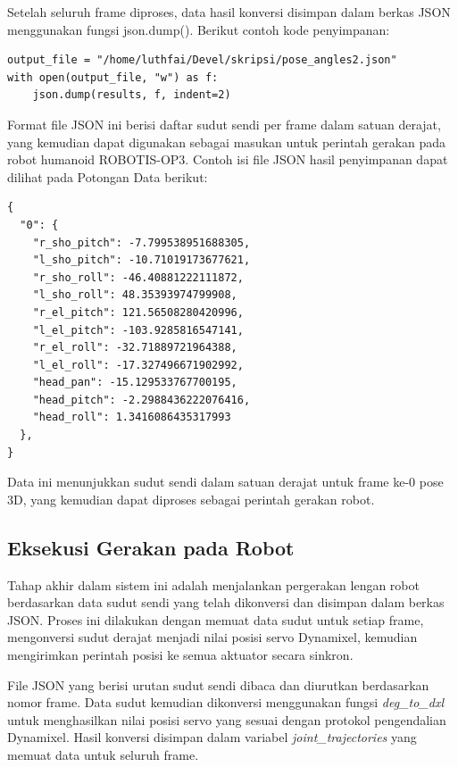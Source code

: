Setelah seluruh frame diproses, data hasil konversi disimpan dalam berkas {JSON} menggunakan fungsi {json.dump()}. Berikut contoh kode penyimpanan:

\begin{lstlisting}[style=plainbox, caption={Penyimpanan hasil gerakan dalam file JSON}]
output_file = "/home/luthfai/Devel/skripsi/pose_angles2.json"
with open(output_file, "w") as f:
    json.dump(results, f, indent=2)
\end{lstlisting}

Format file {JSON} ini berisi daftar sudut sendi per frame dalam satuan derajat, yang kemudian dapat digunakan sebagai masukan untuk perintah gerakan pada robot humanoid ROBOTIS-OP3.
Contoh isi file JSON hasil penyimpanan dapat dilihat pada Potongan Data berikut:

\begin{lstlisting}[style=plainbox, caption={Contoh data sudut sendi dalam format JSON}]
{
  "0": {
    "r_sho_pitch": -7.799538951688305,
    "l_sho_pitch": -10.71019173677621,
    "r_sho_roll": -46.40881222111872,
    "l_sho_roll": 48.35393974799908,
    "r_el_pitch": 121.56508280420996,
    "l_el_pitch": -103.9285816547141,
    "r_el_roll": -32.71889721964388,
    "l_el_roll": -17.327496671902992,
    "head_pan": -15.129533767700195,
    "head_pitch": -2.2988436222076416,
    "head_roll": 1.3416086435317993
  },
}
\end{lstlisting}

Data ini menunjukkan sudut sendi dalam satuan derajat untuk frame ke-0 pose 3D, yang kemudian dapat diproses sebagai perintah gerakan robot.

\subsection{Eksekusi Gerakan pada Robot}

Tahap akhir dalam sistem ini adalah menjalankan pergerakan lengan robot berdasarkan data sudut sendi yang telah dikonversi dan disimpan dalam berkas JSON. Proses ini dilakukan dengan memuat data sudut untuk setiap frame, mengonversi sudut derajat menjadi nilai posisi servo Dynamixel, kemudian mengirimkan perintah posisi ke semua aktuator secara sinkron.

File JSON yang berisi urutan sudut sendi dibaca dan diurutkan berdasarkan nomor frame. Data sudut kemudian dikonversi menggunakan fungsi \textit{deg\_to\_dxl} untuk menghasilkan nilai posisi servo yang sesuai dengan protokol pengendalian Dynamixel. Hasil konversi disimpan dalam variabel \textit{joint\_trajectories} yang memuat data untuk seluruh frame.

